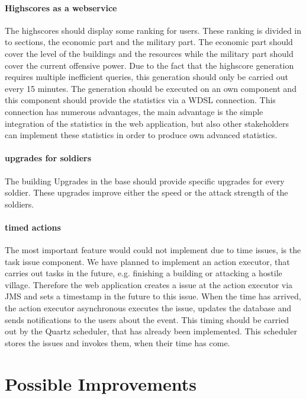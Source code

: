 \documentclass[a4paper]{article}
\begin{document}
\paragraph{Highscores as a webservice}
The highscores should display some ranking for users. These ranking is divided in to sections, the economic part and the military part. The economic part should cover the level of the buildings and the resources while the military part should cover the current offensive power. Due to the fact that the highscore generation requires multiple inefficient queries, this generation should only be carried out every 15 minutes. The generation should be executed on an own component and this component should provide the statistics via a WDSL connection. This connection has numerous advantages, the main advantage is the simple integration of the statistics in the web application, but also other stakeholders can implement these statistics in order to produce own advanced statistics.

\paragraph{upgrades for soldiers}
The building Upgrades in the base should provide specific upgrades for every soldier. These upgrades improve either the speed or the attack strength of the soldiers.

\paragraph{timed actions}
The most important feature would could not implement due to time issues, is the task issue component. We have planned to implement an action executor, that carries out tasks in the future, e.g. finishing a building or attacking a hostile village. Therefore the web application creates a issue at the action executor via JMS and sets a timestamp in the future to this issue. When the time has arrived, the action executor asynchronous executes the issue, updates the database and sends notifications to the users about the event. This timing should be carried out by the Quartz scheduler, that has already been implemented. This scheduler stores the issues and invokes them, when their time has come.


\section{Possible Improvements}
\end{document}
